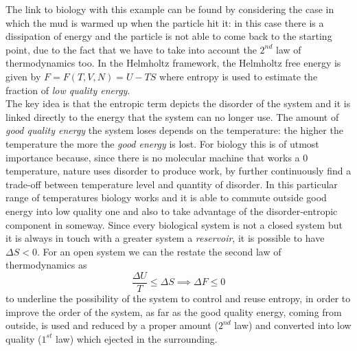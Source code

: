 \documentclass[../main/main.tex]{subfiles}
\begin{document}
The link to biology with this example can be found by considering the case in which the mud is warmed up when the particle hit it: in this case there is a dissipation of energy and the particle is not able to come back to the starting point, due to the fact that we have to take into account the $2^{nd}$ law of thermodynamics too. In the Helmholtz framework, the Helmholtz free energy is given by $F=F(T, V, N) = U-TS$ where entropy is used to estimate the fraction of \emph{low quality energy}. \\
The key idea is that the entropic term depicts the disorder of the system and it is linked directly to the energy that the system can no longer use. The amount of \emph{good quality energy} the system loses depends on the temperature: the higher the temperature the more the \emph{good energy} is lost.
For biology this is of utmost importance because, since there is no molecular machine that works a $0$ temperature, nature uses disorder to produce work, by further continuously find a trade-off between temperature level and quantity of disorder. In this particular range of temperatures biology works and it is able to commute outside good energy into low quality one and also to take advantage of the disorder-entropic component in someway.
Since every biological system is not a closed system but it is always in touch with a greater system a \emph{reservoir}, it is possible to have $\Delta S <0$. 
For an open system we can the restate the second law of thermodynamics as 
\begin{equation}
    \frac{\Delta U}{T} \leq \Delta S \implies \Delta F \leq 0
\end{equation}    
to underline the possibility of the system to control and reuse entropy, in order to improve the order of the system, as far as the good quality energy, coming from outside, is used and reduced by a proper amount ($2^{nd}$ law) and converted into low quality ($1^{st}$ law) which ejected in the surrounding. 
\end{document}
